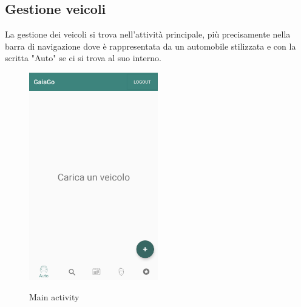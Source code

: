 \subsection{Gestione veicoli}
La gestione dei veicoli si trova nell'attività principale, più precisamente nella barra di navigazione dove è rappresentata da un automobile stilizzata e con la scritta "Auto" se ci si trova al suo interno.
 \begin{figure}[H] 
	\centering 
	\includegraphics[width=0.5\textwidth]{res/images/main_activity_vuota.png}\\
	\caption{Main activity}
	\label{main}
\end{figure}
\pagebreak
